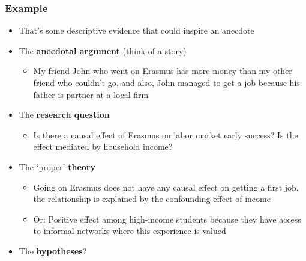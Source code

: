 \documentclass[aspectratio=43]{beamer}
\begin{document}
\begin{frame}
\frametitle{Example}
\centering

\begin{itemize}
  \item That's some descriptive evidence that could inspire an anecdote
  \item The \textbf{anecdotal argument} (think of a story)
  \begin{itemize}
    \item<2-> My friend John who went on Erasmus has more money than my other friend who couldn't go, and also, John managed to get a job because his father is partner at a local firm
  \end{itemize}
  \item The \textbf{research question}
  \begin{itemize}
    \item<2-> Is there a causal effect of Erasmus on labor market early success? Is the effect mediated by household income?
  \end{itemize}
  \item The `proper' \textbf{theory}
  \begin{itemize}
    \item<2-> Going on Erasmus does not have any causal effect on getting a first job, the relationship is explained by the confounding effect of income
    \item<2-> Or: Positive effect among high-income students because they have access to informal networks where this experience is valued
  \end{itemize}
  \item The \textbf{hypotheses}?
\end{itemize}

\end{frame}
\end{document}
